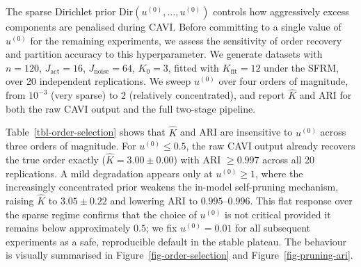 \documentclass[
  letterpaper,
  DIV=11,
  numbers=noendperiod]{scrartcl}
\begin{document}
The sparse Dirichlet prior \(\mathrm{Dir}(u^{(0)}, \ldots, u^{(0)})\)
controls how aggressively excess components are penalised during CAVI.
Before committing to a single value of \(u^{(0)}\) for the remaining
experiments, we assess the sensitivity of order recovery and partition
accuracy to this hyperparameter. We generate datasets with \(n = 120\),
\(J_{\text{act}} = 16\), \(J_{\text{noise}} = 64\), \(K_0 = 3\), fitted
with \(K_{\text{fit}} = 12\) under the SFRM, over 20 independent
replications. We sweep \(u^{(0)}\) over four orders of magnitude, from
\(10^{-3}\) (very sparse) to \(2\) (relatively concentrated), and report
\(\widehat{K}\) and ARI for both the raw CAVI output and the full
two-stage pipeline.

\begin{table}

\caption{\label{tbl-order-selection}Sensitivity of order recovery and
partition accuracy to the Dirichlet hyperparameter \(u^{(0)}\)
(\(K_{\text{fit}} = 12\), \(K_0 = 3\), \(n = 120\), 20 replications).
Bold entries mark exact order recovery (\(\widehat{K} = K_0 = 3\),
\(\text{std} = 0\)).}


\end{table}%

Table~\ref{tbl-order-selection} shows that \(\widehat{K}\) and ARI are
insensitive to \(u^{(0)}\) across three orders of magnitude. For
\(u^{(0)} \le 0.5\), the raw CAVI output already recovers the true order
exactly (\(\widehat{K} = 3.00 \pm 0.00\)) with ARI \(\ge 0.997\) across
all 20 replications. A mild degradation appears only at
\(u^{(0)} \ge 1\), where the increasingly concentrated prior weakens the
in-model self-pruning mechanism, raising \(\widehat{K}\) to
\(3.05 \pm 0.22\) and lowering ARI to \(0.995\)--\(0.996\). This flat
response over the sparse regime confirms that the choice of \(u^{(0)}\)
is not critical provided it remains below approximately \(0.5\); we fix
\(u^{(0)} = 0.01\) for all subsequent experiments as a safe,
reproducible default in the stable plateau. The behaviour is visually
summarised in Figure~\ref{fig-order-selection} and
Figure~\ref{fig-pruning-ari}.
\end{document}
